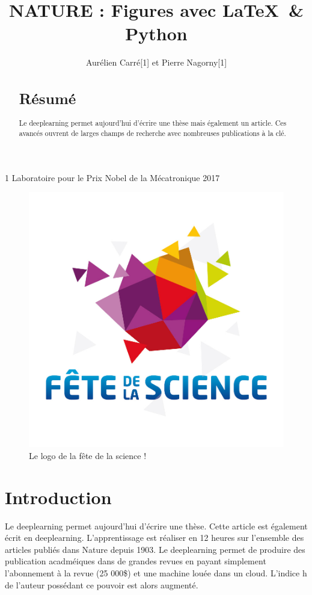\documentclass[10pt,a4paper]{article}
\title{NATURE : Figures avec \LaTeX \ \& Python}
\author{Aurélien Carré[1] et Pierre Nagorny[1]}
\begin{document}
\maketitle

\begin{affiliations}
 \item [1]Laboratoire pour le Prix Nobel de la Mécatronique 2017
\end{affiliations}

\begin{figure}[h]
\begin{center}
\includegraphics[width = .5\textwidth]{fete-science.jpg}
\caption{Le logo de la fête de la science !}
\end{center}
\end{figure}

\begin{abstract}
\section{Résumé}
    Le deeplearning permet aujourd'hui d'écrire une thèse mais également un article. Ces avancés ouvrent de larges champs de recherche avec nombreuses publications à la clé.
\end{abstract}

\section{Introduction}
Le deeplearning permet aujourd'hui d'écrire une thèse. Cette article est également écrit en deeplearning.
L'apprentissage est réaliser en 12 heures sur l'ensemble des articles publiés dans Nature depuis 1903.
Le deeplearning permet de produire des publication acadméiques dans de grandes revues en payant simplement l'abonnement à la revue (25 000\$) et une machine louée dans un cloud. L'indice h de l'auteur possédant ce pouvoir est alors augmenté.
\end{document}
